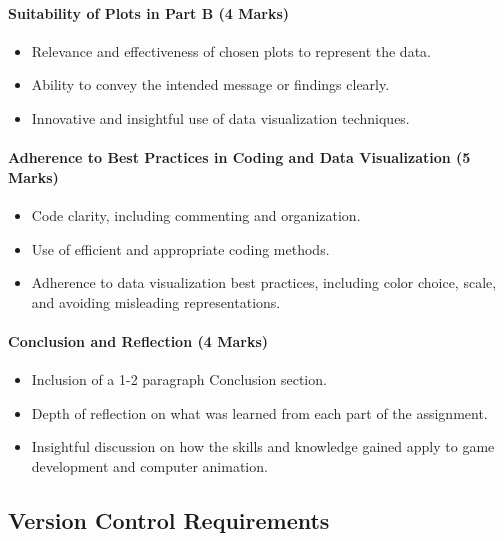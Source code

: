 \documentclass[
  letterpaper,
  DIV=11,
  numbers=noendperiod]{scrartcl}
\let\oldparagraph\paragraph
\renewcommand{\paragraph}[1]{\oldparagraph{#1}\mbox{}}
\providecommand{\tightlist}{%
  \setlength{\itemsep}{0pt}\setlength{\parskip}{0pt}}\usepackage{longtable,booktabs,array}
\begin{document}
\paragraph{Suitability of Plots in Part B (4
Marks)}\label{suitability-of-plots-in-part-b-4-marks}

\begin{itemize}
\tightlist
\item
  Relevance and effectiveness of chosen plots to represent the data.
\item
  Ability to convey the intended message or findings clearly.
\item
  Innovative and insightful use of data visualization techniques.
\end{itemize}

\paragraph{Adherence to Best Practices in Coding and Data Visualization
(5
Marks)}\label{adherence-to-best-practices-in-coding-and-data-visualization-5-marks}

\begin{itemize}
\tightlist
\item
  Code clarity, including commenting and organization.
\item
  Use of efficient and appropriate coding methods.
\item
  Adherence to data visualization best practices, including color
  choice, scale, and avoiding misleading representations.
\end{itemize}

\paragraph{Conclusion and Reflection (4
Marks)}\label{conclusion-and-reflection-4-marks}

\begin{itemize}
\tightlist
\item
  Inclusion of a 1-2 paragraph Conclusion section.
\item
  Depth of reflection on what was learned from each part of the
  assignment.
\item
  Insightful discussion on how the skills and knowledge gained apply to
  game development and computer animation.
\end{itemize}

\subsection{Version Control
Requirements}\label{version-control-requirements}
\end{document}
